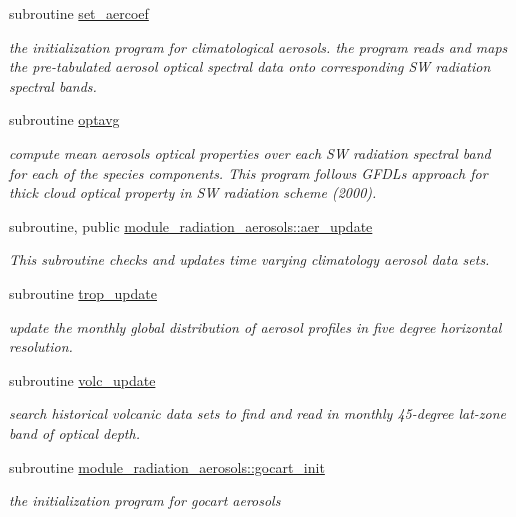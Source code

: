 \begin{DoxyCompactItemize}
subroutine \hyperlink{group__module__radiation__aerosols_ga95fabbc4272ae70f3b345f9b1a898d46}{set\+\_\+aercoef}
\begin{DoxyCompactList}\small\item\em the initialization program for climatological aerosols. the program reads and maps the pre-\/tabulated aerosol optical spectral data onto corresponding SW radiation spectral bands. \end{DoxyCompactList}\item 
subroutine \hyperlink{group__module__radiation__aerosols_ga637761b6110739f2d96322e2ddcc1291}{optavg}
\begin{DoxyCompactList}\small\item\em compute mean aerosols optical properties over each SW radiation spectral band for each of the species components. This program follows G\+F\+DL\textquotesingle{}s approach for thick cloud optical property in SW radiation scheme (2000). \end{DoxyCompactList}\item 
subroutine, public \hyperlink{group__module__radiation__aerosols_ga1828b8076c7413903e66794b20ce1d37}{module\+\_\+radiation\+\_\+aerosols\+::aer\+\_\+update}
\begin{DoxyCompactList}\small\item\em This subroutine checks and updates time varying climatology aerosol data sets. \end{DoxyCompactList}\item 
subroutine \hyperlink{group__module__radiation__aerosols_gafac9a9c603c033c8511e8dbfe984f703}{trop\+\_\+update}
\begin{DoxyCompactList}\small\item\em update the monthly global distribution of aerosol profiles in five degree horizontal resolution. \end{DoxyCompactList}\item 
subroutine \hyperlink{group__module__radiation__aerosols_ga6ec9bd68d45a5f2c6bb9997bdad420c3}{volc\+\_\+update}
\begin{DoxyCompactList}\small\item\em search historical volcanic data sets to find and read in monthly 45-\/degree lat-\/zone band of optical depth. \end{DoxyCompactList}\item 
subroutine \hyperlink{group__module__radiation__aerosols_gaed41923d67caaf1174eaa4303afdc55d}{module\+\_\+radiation\+\_\+aerosols\+::gocart\+\_\+init}
\begin{DoxyCompactList}\small\item\em the initialization program for gocart aerosols \end{DoxyCompactList}\item 

\end{DoxyCompactItemize}
